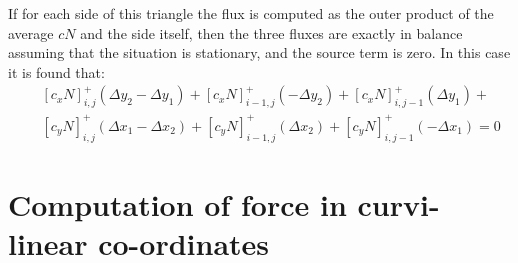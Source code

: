 \documentclass[12pt]{book}
\begin{document}
If for each side of this triangle the flux is computed as the outer product of the average $cN$ and the side itself, then the three fluxes are exactly in balance
assuming that the situation is stationary, and the source term is zero. In this case it is found that:
\begin{eqnarray}
  && \left [ c_x N \right ]_{i,j}^{+} (\Delta y_2 - \Delta y_1) + \left [ c_x N \right ]_{i-1,j}^{+} (-\Delta y_2) +
  \left [ c_x N \right ]_{i,j-1}^{+} (\Delta y_1) + \nonumber \\
  && \left [ c_y N \right ]_{i,j}^{+} (\Delta x_1 - \Delta x_2) + \left [ c_y N \right ]_{i-1,j}^{+} (\Delta x_2) +
  \left [ c_y N \right ]_{i,j-1}^{+} (-\Delta x_1) = 0
\end{eqnarray}

\section{Computation of force in curvi-linear co-ordinates}
\end{document}
